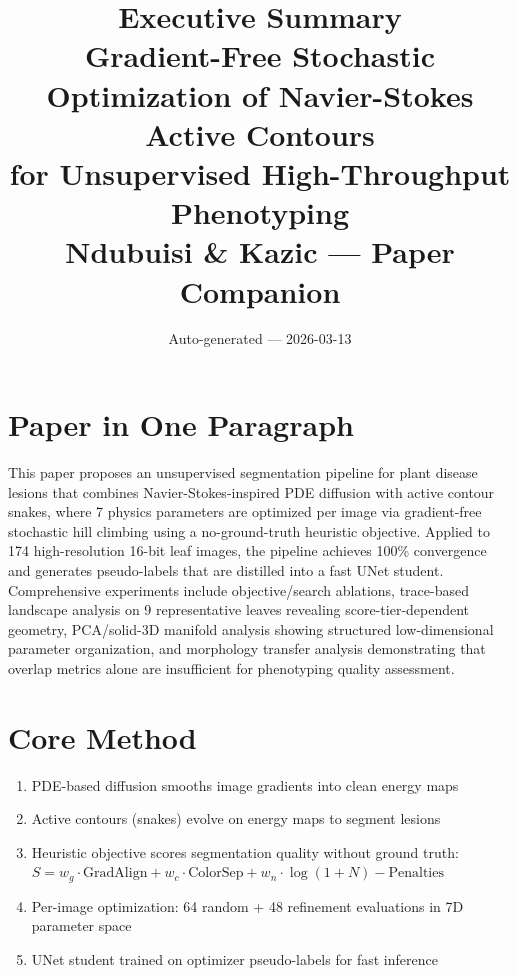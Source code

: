 \documentclass[11pt,a4paper]{article}
\title{\textbf{Executive Summary}\\[0.5em]
\large Gradient-Free Stochastic Optimization of Navier-Stokes Active Contours\\
for Unsupervised High-Throughput Phenotyping\\[0.5em]
\normalsize Ndubuisi \& Kazic --- Paper Companion}
\author{Auto-generated --- 2026-03-13}
\date{}
\begin{document}
\maketitle

\section{Paper in One Paragraph}

This paper proposes an unsupervised segmentation pipeline for plant disease lesions that combines Navier-Stokes-inspired PDE diffusion with active contour snakes, where 7 physics parameters are optimized per image via gradient-free stochastic hill climbing using a no-ground-truth heuristic objective.  Applied to 174 high-resolution 16-bit leaf images, the pipeline achieves 100\% convergence and generates pseudo-labels that are distilled into a fast UNet student.  Comprehensive experiments include objective/search ablations, trace-based landscape analysis on 9 representative leaves revealing score-tier-dependent geometry, PCA/solid-3D manifold analysis showing structured low-dimensional parameter organization, and morphology transfer analysis demonstrating that overlap metrics alone are insufficient for phenotyping quality assessment.

\section{Core Method}

\begin{enumerate}[nosep]
  \item PDE-based diffusion smooths image gradients into clean energy maps
  \item Active contours (snakes) evolve on energy maps to segment lesions
  \item Heuristic objective scores segmentation quality without ground truth:\\
        $S = w_g \cdot \text{GradAlign} + w_c \cdot \text{ColorSep} + w_n \cdot \log(1{+}N) - \text{Penalties}$
  \item Per-image optimization: 64 random + 48 refinement evaluations in 7D parameter space
  \item UNet student trained on optimizer pseudo-labels for fast inference
\end{enumerate}
\end{document}

